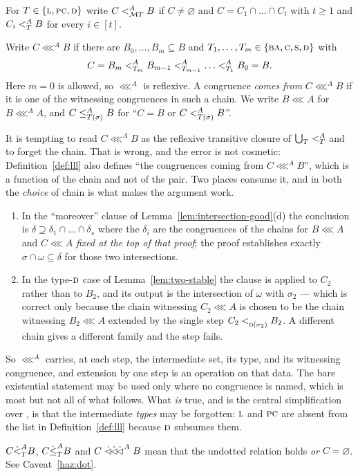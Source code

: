 \begin{definition}\label{def:multitypes}
For $T\in\{\TL,\TPC,\TD\}$ write $C\subt[A]{\MT T}B$ if $C\neq\varnothing$ and
$C=C_{1}\cap\dots\cap C_{t}$ with $t\ge1$ and $C_{i}\subt[A]{T}B$ for every
$i\in[t]$.
\end{definition}

\begin{definition}\label{def:lll}
Write $C\lll^{A}B$ if there are $B_{0},\dots,B_{m}\subseteq B$ and
$T_{1},\dots,T_{m}\in\{\TBA,\TC,\TS,\TD\}$ with
\[
  C=B_{m}\subt[A]{T_{m}}B_{m-1}\subt[A]{T_{m-1}}\dots\subt[A]{T_{1}}B_{0}=B .
\]
Here $m=0$ is allowed, so $\lll^{A}$ is reflexive. A congruence \emph{comes
from} $C\lll^{A}B$ if it is one of the witnessing congruences in such a chain.
We write $B\lll A$ for $B\lll^{A}A$, and $C\subte[A]{T(\sigma)}B$ for
``$C=B$ or $C\subt[A]{T(\sigma)}B$''.
\end{definition}

\begin{hazard}\label{haz:lll-chain}
It is tempting to read $C\lll^{A}B$ as the reflexive transitive closure of
$\bigcup_{T}\subt[A]{T}$ and to forget the chain. That is wrong, and the error
is not cosmetic: Definition~\ref{def:lll} also defines ``the congruences coming
from $C\lll^{A}B$'', which is a function of the chain and not of the pair. Two
places consume it, and in both the \emph{choice} of chain is what makes the
argument work.

\begin{enumerate}\alphlabels\tightlist
\item In the ``moreover'' clause of Lemma~\ref{lem:intersection-good}(d) the
  conclusion is $\delta\supseteq\delta_{1}\cap\dots\cap\delta_{s}$ where the
  $\delta_{i}$ are the congruences of the chains for $B\lll A$ and $C\lll A$
  \emph{fixed at the top of that proof}; the proof establishes exactly
  $\sigma\cap\omega\subseteq\delta$ for those two intersections.
\item In the type-$\TD$ case of Lemma~\ref{lem:two-stable} the clause is
  applied to $C_{2}$ rather than to $B_{2}$, and its output is the intersection
  of $\omega$ with $\sigma_{2}$ --- which is correct only because the chain
  witnessing $C_{2}\lll A$ is chosen to be the chain witnessing
  $B_{2}\lll A$ extended by the single step $C_{2}\subt{\TD(\sigma_{2})}B_{2}$.
  A different chain gives a different family and the step fails.
\end{enumerate}

So $\lll^{A}$ carries, at each step, the intermediate set, its type, and its
witnessing congruence, and extension by one step is an operation on that data.
The bare existential statement may be used only where no congruence is named,
which is most but not all of what follows. What \emph{is} true, and is the
central simplification over \cite{ZhukJACM}, is that the intermediate
\emph{types} may be forgotten: $\TL$ and $\TPC$ are absent from the list in
Definition~\ref{def:lll} because $\TD$ subsumes them.
\end{hazard}

\begin{convention}\label{conv:dotted}
$C\dsubt[A]{T}B$, $C\dsubte[A]{T}B$ and $C\dlll^{A}B$ mean that the undotted
relation holds \emph{or} $C=\varnothing$. See Caveat~\ref{haz:dot}.
\end{convention}

